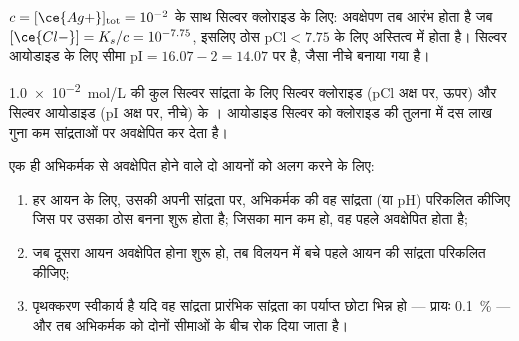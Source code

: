 $c = [\ce{Ag+}]_{\mathrm{tot}} = 10^{-2}$ के साथ सिल्वर क्लोराइड के लिए:
अवक्षेपण तब आरंभ होता है जब $[\ce{Cl-}] = K_s/c = 10^{-7.75}$, इसलिए ठोस
$\mathrm{pCl} < 7.75$ के लिए अस्तित्व में होता है। सिल्वर आयोडाइड के लिए सीमा
$\mathrm{pI} = 16.07 - 2 = 14.07$ पर है, जैसा नीचे बनाया गया है।

\begin{omfigure}

{\small \qty{1.0e-2}{mol/L} की कुल सिल्वर सांद्रता के लिए सिल्वर क्लोराइड
(pCl अक्ष पर, ऊपर) और सिल्वर आयोडाइड (pI अक्ष पर, नीचे) के
। आयोडाइड सिल्वर को क्लोराइड की तुलना में दस लाख
गुना कम सांद्रताओं पर अवक्षेपित कर देता है।}
\end{omfigure}

\begin{method}\label{met:b1:precipitation:selective}
एक ही अभिकर्मक से अवक्षेपित होने वाले दो आयनों को अलग करने के लिए:
\begin{enumerate}
  \item हर आयन के लिए, उसकी अपनी सांद्रता पर, अभिकर्मक की वह
        सांद्रता (या pH) परिकलित कीजिए जिस पर उसका ठोस बनना शुरू होता है; जिसका
        मान कम हो, वह पहले अवक्षेपित होता है;
  \item जब दूसरा आयन अवक्षेपित होना शुरू हो, तब विलयन में बचे पहले आयन की
        सांद्रता परिकलित कीजिए;
  \item पृथक्करण स्वीकार्य है यदि वह सांद्रता प्रारंभिक सांद्रता का पर्याप्त
        छोटा भिन्न हो --- प्रायः \qty{0.1}{\percent}
        --- और तब अभिकर्मक को दोनों सीमाओं के बीच रोक दिया जाता है।
\end{enumerate}
\end{method}

